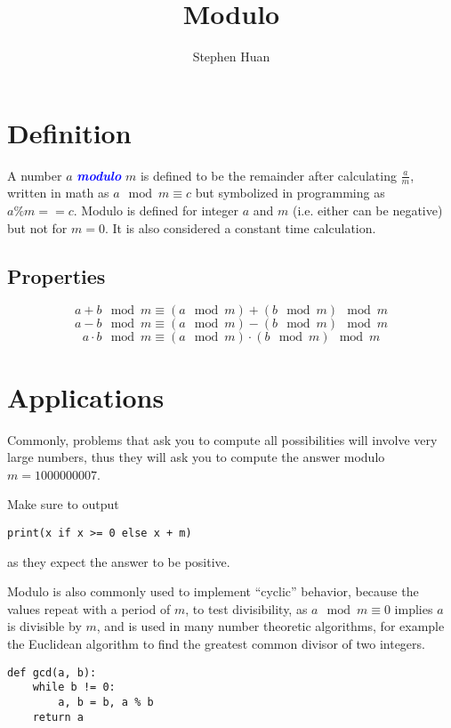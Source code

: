 \documentclass[11pt, oneside]{article}
\title{Modulo}
\author{Stephen Huan}
\newcommand{\emphasis}[1]{\textcolor{blue}{\textbf{\textit{#1}}}}
\begin{document}
\maketitle

\section{Definition}

A number \( a \) \emphasis{modulo} \( m \) is defined to be the remainder after calculating \( \frac{a}{m} \),
written in math as \( a \mod m \equiv c \) but symbolized in programming as \( a \% m == c \).
Modulo is defined for integer \( a \) and \( m \) (i.e. either can be negative) but not for \( m = 0 \).
It is also considered a constant time calculation.

\subsection{Properties}

\[ a + b \mod m \equiv (a \mod m) + (b \mod m) \mod m \]
\[ a - b \mod m \equiv (a \mod m) - (b \mod m) \mod m \]
\[ a \cdot b \mod m \equiv (a \mod m) \cdot (b \mod m) \mod m \]

\section{Applications}

Commonly, problems that ask you to compute all possibilities will involve very large numbers,
thus they will ask you to compute the answer modulo \( m = 1000000007 \).

Make sure to output
\begin{verbatim}
print(x if x >= 0 else x + m)
\end{verbatim}
as they expect the answer to be positive.

Modulo is also commonly used to implement ``cyclic'' behavior, because the values repeat with a period
of \( m \), to test divisibility, as \( a \mod m \equiv 0 \) implies \( a \) is divisible by \( m \), and is used
in many number theoretic algorithms, for example the Euclidean algorithm to find the greatest common divisor of two integers.

\begin{verbatim}
def gcd(a, b):
    while b != 0:
        a, b = b, a % b
    return a
\end{verbatim}
\end{document}
